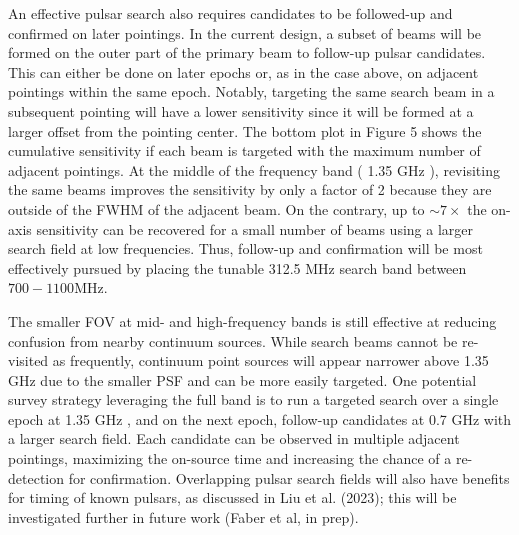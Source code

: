 \documentclass[10pt]{article}
\begin{document}
An effective pulsar search also requires candidates to be followed-up and confirmed on later pointings. In the current design, a subset of beams will be formed on the outer part of the primary beam to follow-up pulsar candidates. This can either be done on later epochs or, as in the case above, on adjacent pointings within the same epoch. Notably, targeting the same search beam in a subsequent pointing will have a lower sensitivity since it will be formed at a larger offset from the pointing center. The bottom plot in Figure 5 shows the cumulative sensitivity if each beam is targeted with the maximum number of adjacent pointings. At the middle of the frequency band ( 1.35 GHz ), revisiting the same beams improves the sensitivity by only a factor of 2 because they are outside of the FWHM of the adjacent beam. On the contrary, up to \(\sim 7 \times\) the on-axis sensitivity can be recovered for a small number of beams using a larger search field at low frequencies. Thus, follow-up and confirmation will be most effectively pursued by placing the tunable 312.5 MHz search band between \(700-1100 \mathrm{MHz}\).

The smaller FOV at mid- and high-frequency bands is still effective at reducing confusion from nearby continuum sources. While search beams cannot be re-visited as frequently, continuum point sources will appear narrower above 1.35 GHz due to the smaller PSF and can be more easily targeted. One potential survey strategy leveraging the full band is to run a targeted search over a single epoch at 1.35 GHz , and on the next epoch, follow-up candidates at 0.7 GHz with a larger search field. Each candidate can be observed in multiple adjacent pointings, maximizing the on-source time and increasing the chance of a re-detection for confirmation. Overlapping pulsar search fields will also have benefits for timing of known pulsars, as discussed in Liu et al. (2023); this will be investigated further in future work (Faber et al, in prep).
\end{document}
